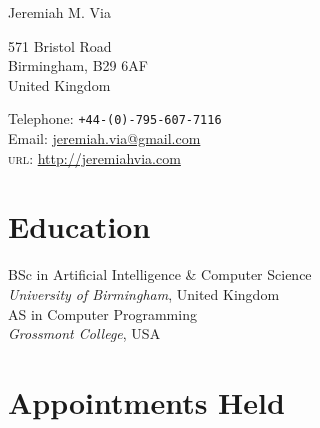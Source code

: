 \documentclass[10pt, a4paper]{article}
\newcommand{\years}[1]{\marginnote{\scriptsize #1}}
\begin{document}
{\LARGE Jeremiah M. Via}\\[1cm]
\begin{minipage}[t]{0.55\textwidth}
  571 Bristol Road\\
  Birmingham, B29 6AF\\
  United Kingdom
\end{minipage}
\begin{minipage}[t]{0.4\textwidth}
  Telephone: \texttt{+44-(0)-795-607-7116}\\
  Email: \href{mailto:jeremiah.via@gmail.com}{jeremiah.via@gmail.com}\\
  \textsc{url}: \href{http://jeremiahvia.com}{http://jeremiahvia.com}
\end{minipage}


\section*{Education}

\years{2012}
\textmd{BSc in Artificial Intelligence \& Computer Science}\\
\textit{University of Birmingham}, United Kingdom\\[.2cm]

\years{2009}
\textmd{AS in Computer Programming}\\
\textit{Grossmont College}, USA


\section*{Appointments Held}

\end{document}
